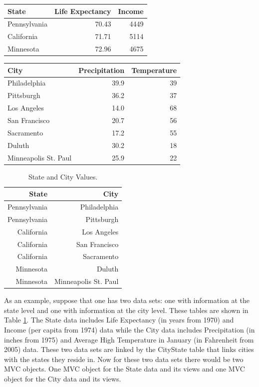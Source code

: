 \documentclass{article}[11pt]
\begin{document}
\small
\begin{tabular}[t]{ | l | r | r | }
  \hline
  State & Life Expectancy & Income \\ \hline
  Pennsylvania & 70.43 & 4449 \\ \hline
  California & 71.71 & 5114 \\ \hline
  Minnesota & 72.96 & 4675 \\ \hline
\end{tabular}
\hspace{10pt}
\begin{tabular}[t]{ | l | r | r | }
  \hline
  City & Precipitation & Temperature \\ \hline
  Philadelphia & 39.9 & 39 \\ \hline
  Pittsburgh & 36.2 & 37 \\ \hline
  Los Angeles & 14.0 & 68 \\ \hline
  San Francisco & 20.7 & 56 \\ \hline
  Sacramento & 17.2 & 55 \\ \hline
  Duluth & 30.2 & 18 \\ \hline
  Minneapolis St. Paul & 25.9 & 22 \\ \hline
\end{tabular}

\begin{table}[h]
  \begin{center}
    \begin{tabular}{ | r | r | }
      \hline
      State & City \\ \hline
      Pennsylvania & Philadelphia \\ \hline
      Pennsylvania & Pittsburgh \\ \hline
      California & Los Angeles \\ \hline
      California & San Francisco \\ \hline
      California & Sacramento \\ \hline
      Minnesota & Duluth \\ \hline
      Minnesota & Minneapolis St. Paul \\ \hline
    \end{tabular}
    \caption{State and City Values.}\label{Tab:CityState}
  \end{center}
\end{table}

\normalsize
As an example, suppose that one has two data sets: one with information at the
state level and one with information at the city level.  These tables are
shown in Table \ref{Tab:CityState}.  The State data includes Life Expectancy
(in years from 1970) and Income (per capita from 1974) data
while the City data includes Precipitation (in inches from 1975) and Average
High Temperature in January (in Fahrenheit from 2005)
data.  These two data sets are linked by the CityState table that links cities
with the states they reside in.  Now for these two data sets there would be
two MVC objects.  One MVC object for the State data and its views and one MVC
object for the City data and its views. 
\end{document}

